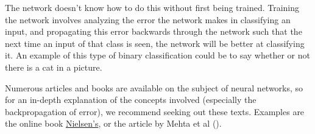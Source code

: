 The network doesn't know how to do this without first being trained.
Training the network involves analyzing the error the network makes in
classifying an input, and propagating this error backwards through the network
such that the next time an input of that class is seen, the network will be
better at classifying it.
An example of this type of binary classification could be to say whether or
not there is a cat in a picture.

Numerous articles and books are available on the subject of neural networks,
so for an in-depth explanation of the concepts involved (especially the
backpropagation of error), we recommend seeking out these texts.
Examples are the online book \href{http://neuralnetworksanddeeplearning.com/}{Nielsen's}, or the article by Mehta et al (\cite{HighBias}).


